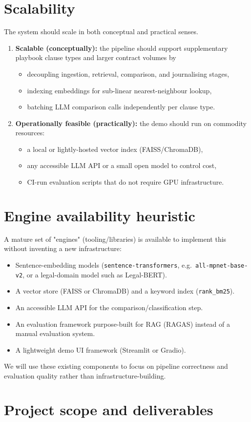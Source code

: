 \documentclass[11pt]{article}
\newcommand{\secx}[1]{\section{#1}}
\begin{document}
\secx{Scalability}
The system should scale in both conceptual and practical senses.
\begin{enumerate}
  \item \textbf{Scalable (conceptually):} the pipeline should support supplementary
  playbook clause types and larger contract volumes by
  \begin{itemize}
    \item decoupling ingestion, retrieval, comparison, and journalising stages,
    \item indexing embeddings for sub-linear nearest-neighbour lookup,
    \item batching LLM comparison calls independently per clause type.
  \end{itemize}
  \item \textbf{Operationally feasible (practically):} the demo should run on
  commodity resources:
  \begin{itemize}
    \item a local or lightly-hosted vector index (FAISS/ChromaDB),
    \item any accessible LLM API or a small open model to control cost,
    \item CI-run evaluation scripts that do not require GPU infrastructure.
  \end{itemize}
\end{enumerate}

\secx{Engine availability heuristic}
A mature set of  "engines" (tooling/libraries) is available to implement this
without inventing a new infrastructure:
\begin{itemize}
  \item Sentence-embedding models (\texttt{sentence-transformers}, e.g.\
  \texttt{all-mpnet-base-v2}, or a legal-domain model such as Legal-BERT).
  \item A vector store (FAISS or ChromaDB) and a keyword index (\texttt{rank\_bm25}).
  \item An accessible LLM API for the comparison/classification step.
  \item An evaluation framework purpose-built for RAG (RAGAS) instead of a
  manual evaluation system.
  \item A lightweight demo UI framework (Streamlit or Gradio).
\end{itemize}
We will use these existing components to focus on pipeline correctness and evaluation
quality rather than infrastructure-building.

\secx{Project scope and deliverables}
\end{document}

